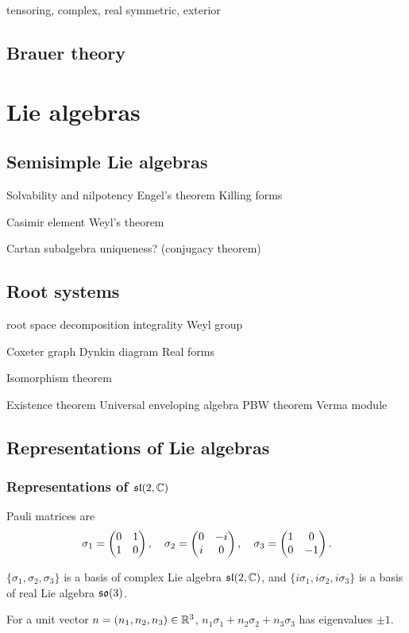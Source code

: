 \documentclass{../note}
\begin{document}
tensoring, complex, real
symmetric, exterior


\chapter{Brauer theory}












\part{Lie algebras}
\chapter{Semisimple Lie algebras}
Solvability and nilpotency
Engel's theorem
Killing forms

Casimir element
Weyl's theorem

Cartan subalgebra uniqueness? (conjugacy theorem)




\chapter{Root systems}
root space decomposition
integrality
Weyl group

Coxeter graph
Dynkin diagram
Real forms

Isomorphism theorem

Existence theorem
Universal enveloping algebra
PBW theorem
Verma module




\chapter{Representations of Lie algebras}
\section{Representations of $\mathfrak{sl}(2,\mathbb{C})$}
\begin{prb}
Pauli matrices are
\[\sigma_1=\begin{pmatrix}0&1\\1&0\end{pmatrix},\quad\sigma_2=\begin{pmatrix}0&-i\\i&0\end{pmatrix},\quad\sigma_3=\begin{pmatrix}1&0\\0&-1\end{pmatrix}.\]
\begin{parts}
\item $\{\sigma_1,\sigma_2,\sigma_3\}$ is a basis of complex Lie algebra $\mathfrak{sl}(2,\mathbb{C})$, and $\{i\sigma_1,i\sigma_2,i\sigma_3\}$ is a basis of real Lie algebra $\mathfrak{so}(3)$.
\item For a unit vector $n=(n_1,n_2,n_3)\in\mathbb{R}^3$, $n_1\sigma_1+n_2\sigma_2+n_3\sigma_3$ has eigenvalues $\pm1$.
\end{parts}
\end{prb}
\end{document}
